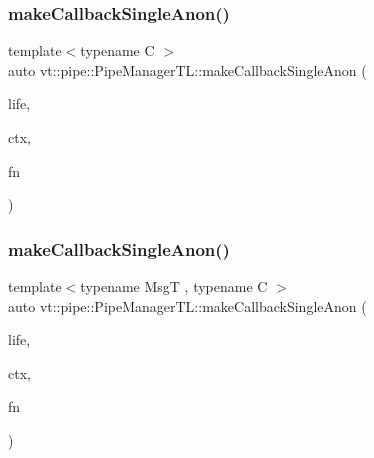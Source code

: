 \subsubsection{\texorpdfstring{make\+Callback\+Single\+Anon()}{makeCallbackSingleAnon()}\hspace{0.1cm}{\footnotesize\ttfamily [4/6]}}
{\footnotesize\ttfamily template$<$typename C $>$ \\
auto vt\+::pipe\+::\+Pipe\+Manager\+T\+L\+::make\+Callback\+Single\+Anon (\begin{DoxyParamCaption}\item[{\hyperlink{namespacevt_1_1pipe_acb42b284378c0fdac1d7c6335dc26f58}{Lifetime\+Enum}}]{life,  }\item[{C $\ast$}]{ctx,  }\item[{\hyperlink{structvt_1_1pipe_1_1_pipe_manager_base_ad8463823b6b4cfdb67c119d6d22e3bac}{Func\+Ctx\+Type}$<$ C $>$}]{fn }\end{DoxyParamCaption})}

\mbox{\label{structvt_1_1pipe_1_1_pipe_manager_t_l_ad0dca13f93e697e5c6329919ae77378f}} 
\subsubsection{\texorpdfstring{make\+Callback\+Single\+Anon()}{makeCallbackSingleAnon()}\hspace{0.1cm}{\footnotesize\ttfamily [5/6]}}
{\footnotesize\ttfamily template$<$typename MsgT , typename C $>$ \\
auto vt\+::pipe\+::\+Pipe\+Manager\+T\+L\+::make\+Callback\+Single\+Anon (\begin{DoxyParamCaption}\item[{\hyperlink{namespacevt_1_1pipe_acb42b284378c0fdac1d7c6335dc26f58}{Lifetime\+Enum}}]{life,  }\item[{C $\ast$}]{ctx,  }\item[{\hyperlink{structvt_1_1pipe_1_1_pipe_manager_base_a73fdf82ece0411b3dc644c99b763f7a9}{Func\+Msg\+Ctx\+Type}$<$ MsgT, C $>$}]{fn }\end{DoxyParamCaption})}

\mbox{\label{structvt_1_1pipe_1_1_pipe_manager_t_l_aea9bdf9ea02e21ebd98393907ff432ea}} 
